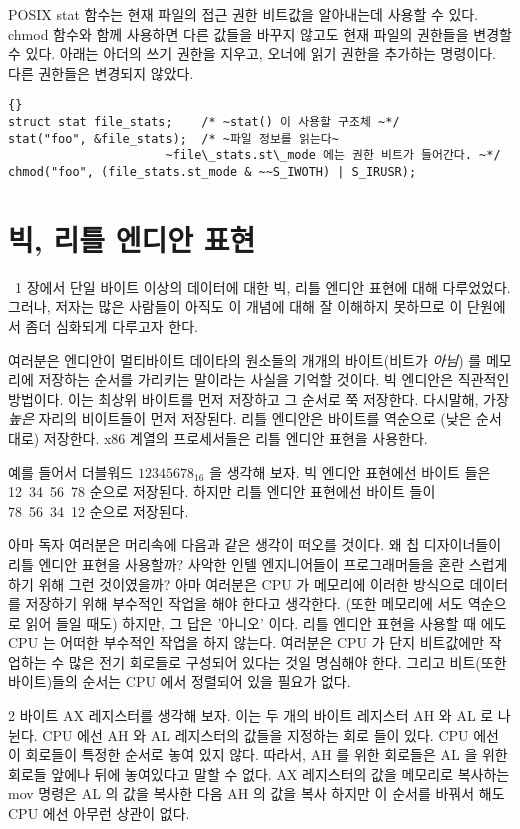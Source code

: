 POSIX {\code stat} 함수는 현재 파일의 접근 권한 비트값을 알아내는데
사용할 수 있다. {\code chmod} 함수와 함께 사용하면 다른 값들을 바꾸지 
않고도 현재 파일의 권한들을 변경할 수 있다. 아래는 아더의 쓰기 권한을
지우고, 오너에 읽기 권한을 추가하는 명령이다. 다른 권한들은 
변경되지 않았다. 

\begin{lstlisting}[escapeinside=~~]{}
struct stat file_stats;    /* ~stat() 이 사용할 구조체 ~*/
stat("foo", &file_stats);  /* ~파일 정보를 읽는다~
                      ~file\_stats.st\_mode 에는 권한 비트가 들어간다. ~*/
chmod("foo", (file_stats.st_mode & ~~S_IWOTH) | S_IRUSR);
\end{lstlisting}

\section{빅, 리틀 엔디안 표현}

~1 장에서 단일 바이트 이상의 데이터에 대한 빅, 리틀 엔디안
표현에 대해 다루었었다. 그러나, 저자는 많은 사람들이 아직도
이 개념에 대해 잘 이해하지 못하므로 이 단원에서 좀더 심화되게 다루고자
한다. 

여러분은 엔디안이 멀티바이트 데이타의 원소들의 개개의 바이트(비트가 \emph{아님})
를 메모리에 저장하는 순서를 가리키는 말이라는 사실을 기억할 것이다. 빅 엔디안은
직관적인 방법이다. 이는 최상위 바이트를 먼저 저장하고 그 순서로 쭉 저장한다. 다시말해,
가장 \emph{높은} 자리의 비이트들이 먼저 저장된다. 리틀 엔디안은 바이트를 역순으로 
(낮은 순서대로) 저장한다. x86 계열의 프로세서들은 리틀 엔디안 표현을 사용한다.

예를 들어서 더블워드 $12345678_{16}$ 을 생각해 보자. 빅 엔디안 표현에선 바이트
들은  12~34~56~78 순으로 저장된다. 하지만 리틀 엔디안 표현에선 바이트 들이
78~56~34~12 순으로 저장된다. 

아마 독자 여러분은 머리속에 다음과 같은 생각이 떠오를 것이다. 왜 칩 디자이너들이
리틀 엔디안 표현을 사용할까? 사악한 인텔 엔지니어들이 프로그래머들을 혼란
스럽게 하기 위해 그런 것이였을까? 아마 여러분은 CPU 가 메모리에 이러한 방식으로
데이터를 저장하기 위해 부수적인 작업을 해야 한다고 생각한다. (또한 메모리에 
서도 역순으로 읽어 들일 때도) 하지만, 그 답은 '아니오' 이다. 리틀 엔디안 표현을 
사용할 때 에도 CPU 는 어떠한 부수적인 작업을 하지 않는다. 여러분은 CPU 가 단지
비트값에만 작업하는 수 많은 전기 회로들로 구성되어 있다는 것일 명심해야 한다. 그리고
비트(또한 바이트)들의 순서는 CPU 에서 정렬되어 있을 필요가 없다. 

2 바이트 {\code AX} 레지스터를 생각해 보자. 이는 두 개의 바이트 레지스터 {\code AH}
와 {\code AL} 로 나뉜다. CPU 에선 {\code AH} 와 {\code AL} 레지스터의 값들을
지정하는 회로 들이 있다. CPU 에선 이 회로들이 특정한 순서로 놓여 있지 않다. 
따라서, {\code AH} 를 위한 회로들은 {\code AL} 을 위한 회로들 앞에나 뒤에 놓여있다고
말할 수 없다. {\code AX} 레지스터의 값을 메모리로 복사하는 {\code mov} 명령은 
{\code AL} 의 값을 복사한 다음 {\code AH} 의 값을 복사 하지만 이 순서를 바꿔서 해도
CPU 에선 아무런 상관이 없다. 

